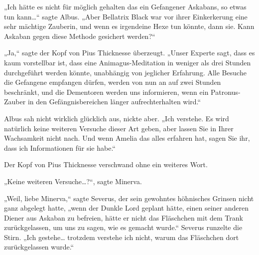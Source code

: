 „Ich hätte es nicht für möglich gehalten das ein Gefangener Askabans, so etwas tun kann…“ sagte Albus. „Aber Bellatrix Black war vor ihrer Einkerkerung eine sehr mächtige Zauberin, und wenn es irgendeine Hexe tun könnte, dann sie. Kann Askaban gegen diese Methode gesichert werden?“

„Ja,“ sagte der Kopf von Pius Thicknesse überzeugt. „Unser Experte sagt, dass es kaum vorstellbar ist, dass eine Animagus-Meditation in weniger als drei Stunden durchgeführt werden könnte, unabhängig von jeglicher Erfahrung. Alle Besuche die Gefangene empfangen dürfen, werden von nun an auf zwei Stunden beschränkt, und die Dementoren werden uns informieren, wenn ein Patronus-Zauber in den Gefängnisbereichen länger aufrechterhalten wird.“

Albus sah nicht wirklich glücklich aus, nickte aber. „Ich verstehe. Es wird natürlich keine weiteren Versuche dieser Art geben, aber lassen Sie in Ihrer Wachsamkeit nicht nach. Und wenn Amelia das alles erfahren hat, sagen Sie ihr, dass ich Informationen für sie habe.“

Der Kopf von Pius Thicknesse verschwand ohne ein weiteres Wort.

„Keine weiteren Versuche…?“, sagte Minerva.

„Weil, liebe Minerva,“ sagte Severus, der sein gewohntes höhnisches Grinsen nicht ganz abgelegt hatte, „wenn der Dunkle Lord geplant hätte, einen seiner anderen Diener aus Askaban zu befreien, hätte er nicht das Fläschchen mit dem Trank zurückgelassen, um uns zu sagen, wie es gemacht wurde.“ Severus runzelte die Stirn. „Ich gestehe… trotzdem verstehe ich nicht, warum das Fläschchen dort zurückgelassen wurde.“

